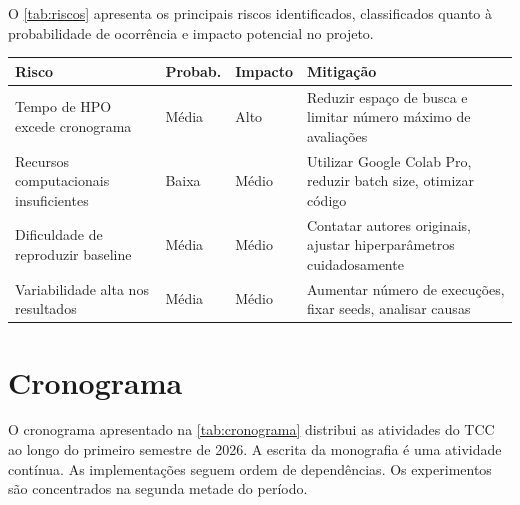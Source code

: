 O \autoref{tab:riscos} apresenta os principais riscos identificados, classificados quanto à probabilidade de ocorrência e impacto potencial no projeto.

\begin{quadro}[H]
    \centering
    \caption{Análise de riscos}
    \begin{tabular}{|p{}|p{}|p{}|p{}|}
        \hline
        \rowcolor[HTML]{C0C0C0}
        \textbf{Risco} & \textbf{Probab.} & \textbf{Impacto} & \textbf{Mitigação} \\
        \hline

        Tempo de HPO excede cronograma & Média & Alto & Reduzir espaço de busca e limitar número máximo de avaliações \\
        \hline

        Recursos computacionais insuficientes & Baixa & Médio & Utilizar Google Colab Pro, reduzir batch size, otimizar código \\
        \hline

        Dificuldade de reproduzir baseline & Média & Médio & Contatar autores originais, ajustar hiperparâmetros cuidadosamente \\
        \hline

        Variabilidade alta nos resultados & Média & Médio & Aumentar número de execuções, fixar seeds, analisar causas \\
        \hline
    \end{tabular}
    \label{tab:riscos}
\end{quadro}

\section{Cronograma}

O cronograma apresentado na \autoref{tab:cronograma} distribui as atividades do TCC ao longo do primeiro semestre de 2026. A escrita da monografia é uma atividade contínua. As implementações seguem ordem de dependências. Os experimentos são concentrados na segunda metade do período.

